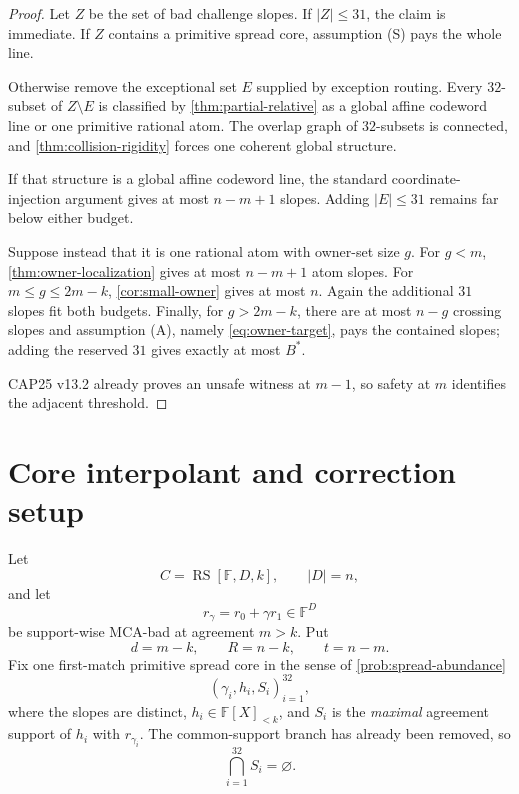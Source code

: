 \documentclass[11pt,a4paper]{amsart}
\numberwithin{equation}{section}
\theoremstyle{remark}
\DeclareMathOperator{\RS}{RS}\DeclareMathOperator{\MCA}{MCA}\DeclareMathOperator{\CA}{CA}
\newcommand{\F}{\mathbb F}\newcommand{\B}{\mathbb B}\newcommand{\K}{\mathbb K}\newcommand{\Z}{\mathbb Z}
\begin{document}
\begin{proof}
Let $Z$ be the set of bad challenge slopes.  If $|Z|\le31$, the claim is immediate.  If $Z$ contains a primitive spread core, assumption (S) pays the whole line.

Otherwise remove the exceptional set $E$ supplied by exception routing.  Every $32$-subset of $Z\setminus E$ is classified by \cref{thm:partial-relative} as a global affine codeword line or one primitive rational atom.  The overlap graph of $32$-subsets is connected, and \cref{thm:collision-rigidity} forces one coherent global structure.

If that structure is a global affine codeword line, the standard coordinate-injection argument gives at most $n-m+1$ slopes.  Adding $|E|\le31$ remains far below either budget.

Suppose instead that it is one rational atom with owner-set size $g$.  For $g<m$, \cref{thm:owner-localization} gives at most $n-m+1$ atom slopes.  For $m\le g\le2m-k$, \cref{cor:small-owner} gives at most $n$.  Again the additional $31$ slopes fit both budgets.  Finally, for $g>2m-k$, there are at most $n-g$ crossing slopes and assumption (A), namely \eqref{eq:owner-target}, pays the contained slopes; adding the reserved $31$ gives exactly at most $B^*$.

CAP25 v13.2 already proves an unsafe witness at $m-1$, so safety at $m$ identifies the adjacent threshold.
\end{proof}

\section{Core interpolant and correction setup}

Let
\[
 C=\RS[\F,D,k],\qquad |D|=n,
\]
and let
\[
 r_\gamma=r_0+\gamma r_1\in\F^D
\]
be support-wise MCA-bad at agreement $m>k$.  Put
\[
 d=m-k,\qquad R=n-k,\qquad t=n-m.
\]
Fix one first-match primitive spread core in the sense of \cref{prob:spread-abundance}
\[
 (\gamma_i,h_i,S_i)_{i=1}^{32},
\]
where the slopes are distinct, $h_i\in\F[X]_{<k}$, and $S_i$ is the \emph{maximal} agreement support of $h_i$ with $r_{\gamma_i}$.  The common-support branch has already been removed, so
\begin{equation}\label{eq:no-common}
 \bigcap_{i=1}^{32}S_i=\varnothing.
\end{equation}
\end{document}
